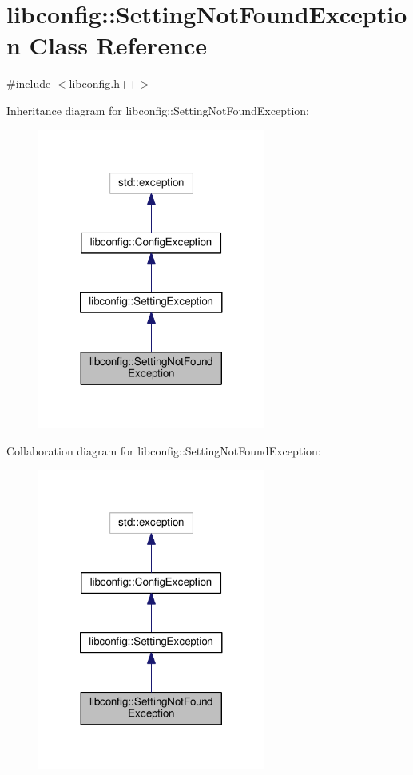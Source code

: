 \hypertarget{classlibconfig_1_1SettingNotFoundException}{\section{libconfig\-:\-:Setting\-Not\-Found\-Exception Class Reference}
\label{classlibconfig_1_1SettingNotFoundException}
}


{\ttfamily \#include $<$libconfig.\-h++$>$}



Inheritance diagram for libconfig\-:\-:Setting\-Not\-Found\-Exception\-:\nopagebreak
\begin{figure}[H]
\begin{center}
\leavevmode
\includegraphics[width=212pt]{classlibconfig_1_1SettingNotFoundException__inherit__graph}
\end{center}
\end{figure}


Collaboration diagram for libconfig\-:\-:Setting\-Not\-Found\-Exception\-:\nopagebreak
\begin{figure}[H]
\begin{center}
\leavevmode
\includegraphics[width=212pt]{classlibconfig_1_1SettingNotFoundException__coll__graph}
\end{center}
\end{figure}
